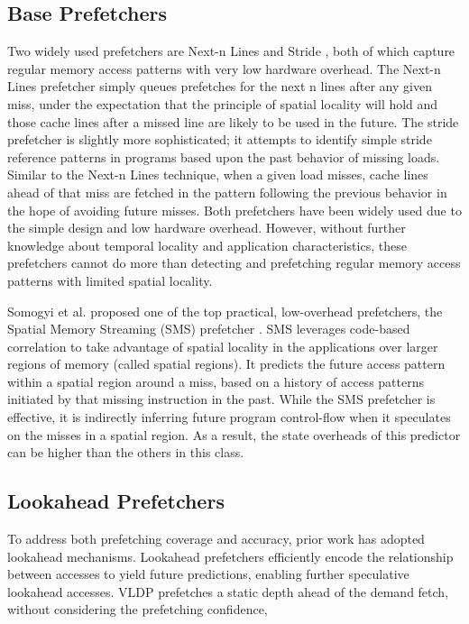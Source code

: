 \subsection{Base Prefetchers}

Two widely used prefetchers are Next-n Lines \cite{nextn} and Stride \cite{stride}, both of which capture regular memory access patterns with very low hardware overhead. The Next-n Lines prefetcher simply queues prefetches for the next n lines after any given miss, under the expectation that the principle of spatial locality will hold and those cache lines after a missed line are likely to be used in the future. The stride prefetcher is slightly more sophisticated; it attempts to identify simple stride reference patterns in programs based upon the past behavior of missing loads. Similar to the Next-n Lines technique, when a given load misses, cache lines ahead of that miss are fetched in the pattern following the previous behavior in the hope of avoiding future misses. Both prefetchers have been widely used due to the simple design and low hardware overhead. However, without further knowledge about temporal locality and application characteristics, these prefetchers cannot do more than detecting and prefetching regular memory access patterns with limited spatial locality.

Somogyi et al. proposed one of the top practical, low-overhead prefetchers, the Spatial Memory Streaming (SMS) prefetcher \cite{SMS}. SMS leverages code-based correlation to take advantage of spatial locality in the applications over larger regions of memory (called spatial regions). It predicts the future access pattern within a spatial region around a miss, based on a history of access patterns initiated by that missing instruction in the past. While the SMS prefetcher is effective, it is indirectly inferring future program control-flow when it speculates on the misses in a spatial region. As a result, the state overheads of this predictor can be higher than the others in this class.

\subsection{Lookahead Prefetchers}

To address both prefetching coverage and accuracy, prior work has adopted lookahead 
mechanisms. Lookahead prefetchers efficiently encode the relationship between accesses to yield future predictions, enabling further speculative lookahead accesses.
VLDP \cite {VLDP} prefetches a static depth ahead of the demand fetch, without considering the prefetching confidence, 

